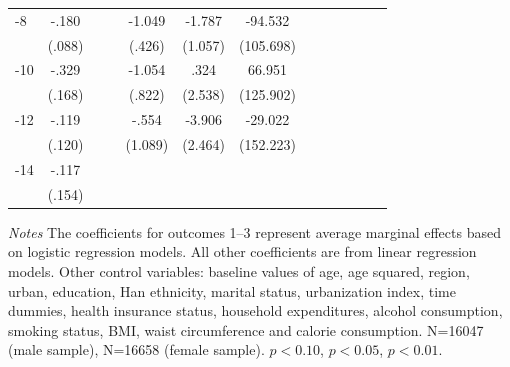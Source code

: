 \begin{table}[!ht]
\begin{adjustbox}{max width=\linewidth}
\begin{threeparttable}
{\begin{tabular}{l*{6}{S
S}}
-8             &    -.180\sym{**} &         &         &   -1.049\sym{**} &   -1.787\sym{*}  &  -94.532         \\
                &   (.088)         &         &         &   (.426)         &  (1.057)         &(105.698)         \\
-10            &    -.329\sym{*}  &         &         &   -1.054         &     .324         &   66.951         \\
                &   (.168)         &         &         &   (.822)         &  (2.538)         &(125.902)         \\
-12           &    -.119         &         &         &    -.554         &   -3.906         &  -29.022         \\
                &   (.120)         &         &         &  (1.089)         &  (2.464)         &(152.223)         \\
-14           &    -.117         &         &         &                  &                  &                  \\
                &   (.154)         &         &         &                  &                  &                  \\
\bottomrule
\end{tabular}
\begin{tablenotes}
\item \footnotesize \textit{Notes} The coefficients for outcomes 1--3 represent average marginal effects based on logistic regression models. All other coefficients are from linear regression models. Other control variables: baseline values of age, age squared, region, urban, education, Han ethnicity, marital status, urbanization index, time dummies, health insurance status, household expenditures, alcohol consumption, smoking status, BMI, waist circumference and calorie consumption. N=16047 (male sample), N=16658 (female sample). \sym{*} \(p<0.10\), \sym{**} \(p<0.05\), \sym{***} \(p<0.01\).
\end{tablenotes}
}
\end{threeparttable}
\end{adjustbox}
\end{table}


